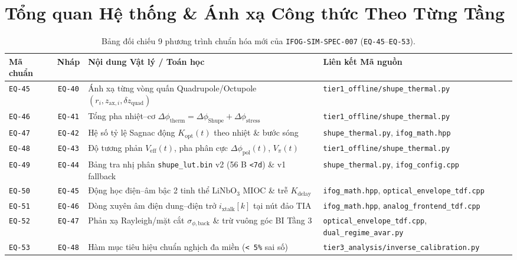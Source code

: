 \documentclass[11pt, a4paper]{article}
\begin{document}
\tableofcontents
\vspace{0.2cm}

\section{Tổng quan Hệ thống \& Ánh xạ Công thức Theo Từng Tầng}

\begin{table}[htbp]
\centering
\caption{Bảng đối chiếu 9 phương trình chuẩn hóa mới của \texttt{IFOG-SIM-SPEC-007} (\texttt{EQ-45}--\texttt{EQ-53}).}
\footnotesize
\begin{tabular}{@{}l c L{5.4cm} L{4.8cm}@{}}
\toprule
\textbf{Mã chuẩn} & \textbf{Nháp} & \textbf{Nội dung Vật lý / Toán học} & \textbf{Liên kết Mã nguồn} \\
\midrule
\texttt{EQ-45} & \texttt{EQ-40} & Ánh xạ từng vòng quấn Quadrupole/Octupole $(r_i, z_{\text{ax},i}, \delta z_{\text{quad}})$ & \texttt{tier1\_offline/shupe\_thermal.py} \\
\texttt{EQ-46} & \texttt{EQ-41} & Tổng pha nhiệt--cơ $\Delta\phi_{\text{therm}} = \Delta\phi_{\text{Shupe}} + \Delta\phi_{\text{stress}}$ & \texttt{tier1\_offline/shupe\_thermal.py} \\
\texttt{EQ-47} & \texttt{EQ-42} & Hệ số tỷ lệ Sagnac động $K_{\text{opt}}(t)$ theo nhiệt \& bước sóng & \texttt{shupe\_thermal.py}, \texttt{ifog\_math.hpp} \\
\texttt{EQ-48} & \texttt{EQ-43} & Độ tương phản $V_{\text{eff}}(t)$, pha phân cực $\Delta\phi_{\text{pol}}(t)$, $V_\pi(t)$ & \texttt{tier1\_offline/shupe\_thermal.py} \\
\texttt{EQ-49} & \texttt{EQ-44} & Bảng tra nhị phân \texttt{shupe\_lut.bin} v2 (56 B \texttt{<7d}) \& v1 fallback & \texttt{shupe\_thermal.py}, \texttt{ifog\_config.cpp} \\
\texttt{EQ-50} & \texttt{EQ-45} & Động học điện--âm bậc 2 tinh thể $\text{LiNbO}_3$ MIOC \& trễ $K_{\text{delay}}$ & \texttt{ifog\_math.hpp}, \texttt{optical\_envelope\_tdf.cpp} \\
\texttt{EQ-51} & \texttt{EQ-46} & Dòng xuyên âm điện dung--điện trở $i_{\text{xtalk}}[k]$ tại nút đảo TIA & \texttt{ifog\_math.hpp}, \texttt{analog\_frontend\_tdf.cpp} \\
\texttt{EQ-52} & \texttt{EQ-47} & Phản xạ Rayleigh/mặt cắt $\sigma_{\phi,\text{back}}$ \& trừ vuông góc BI Tầng 3 & \texttt{optical\_envelope\_tdf.cpp}, \texttt{dual\_regime\_avar.py} \\
\texttt{EQ-53} & \texttt{EQ-48} & Hàm mục tiêu hiệu chuẩn nghịch đa miền (\texttt{< 5\%} sai số) & \texttt{tier3\_analysis/inverse\_calibration.py} \\
\bottomrule
\end{tabular}
\end{table}
\end{document}
